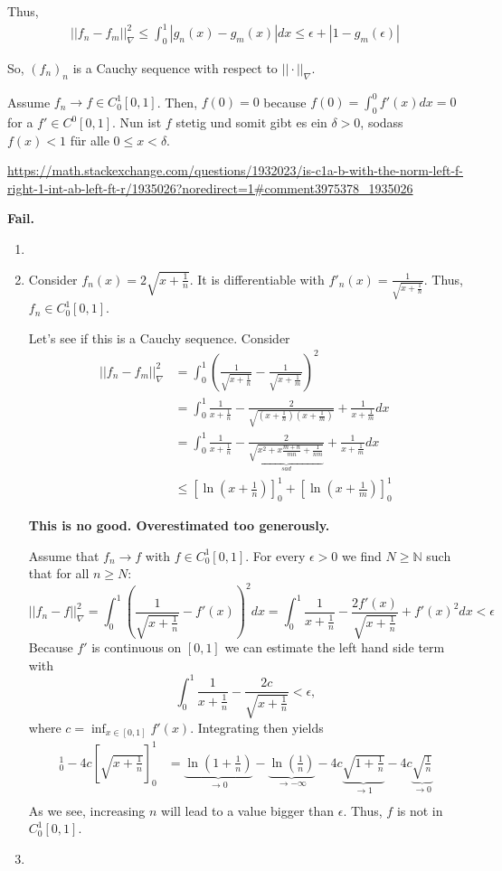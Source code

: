 \documentclass[a4paper]{article}
\renewcommand{\hline}{\noindent\makebox[\linewidth]{\rule{12cm}{1pt}}}
\begin{document}
Thus,
\begin{align*}
||f_n - f_m||^2_\nabla \leq \int^1_0 |g_n(x) - g_m(x)|dx \leq \epsilon + |1 - g_m(\epsilon)|
\end{align*}

So, $(f_n)_n$ is a Cauchy sequence with respect to $||\cdot||_\nabla$.

Assume $f_n \to f \in C^1_0[0,1]$. Then, $f(0) = 0$ because $f(0) = \int^0_0 f'(x) dx = 0$ for a $f' \in C^0[0,1]$. Nun ist $f$ stetig und somit gibt es ein $\delta > 0$, sodass $f(x) < 1$ für alle $0\leq x < \delta$.

\url{https://math.stackexchange.com/questions/1932023/is-c1a-b-with-the-norm-left-f-right-1-int-ab-left-ft-r/1935026?noredirect=1#comment3975378_1935026}

\hline

\textbf{Fail.}

\begin{enumerate}
\item 

\item Consider $f_n(x) = 2\sqrt{x+\frac{1}{n}}$. It is differentiable with $f'_n(x) = \frac{1}{\sqrt{x+\frac{1}{n}}}$. Thus, $f_n \in C^1_0[0,1]$. 

Let's see if this is a Cauchy sequence. Consider
\begin{align*}
	||f_n - f_m||^2_{\nabla} &= \int^1_0 ( \frac{1}{\sqrt{x+\frac{1}{n}}} -  \frac{1}{\sqrt{x+\frac{1}{m}}})^2 \\
	&= \int^1_0 \frac{1}{x+\frac{1}{n}} - \frac{2}{\sqrt{(x + \frac{1}{n})(x + \frac{1}{m})}} + \frac{1}{x+\frac{1}{m}} dx \\
	&= \int^1_0 \frac{1}{x+\frac{1}{n}} - 
	\frac{2}{\underbrace{\sqrt{x^2 +x\frac{m+n}{mn} + \frac{1}{nm}}}_{sad}}
	+ \frac{1}{x+\frac{1}{m}} dx \\
	&\leq [\ln(x+\frac{1}{n})]^1_0 + [\ln(x+\frac{1}{m})]^1_0
\end{align*}

\textbf{This is no good. Overestimated too generously.}

Assume that $f_n \to f$ with $f \in C^1_0[0,1]$. For every $\epsilon > 0$ we find $N \geq \mathbb N$ such that for all $n \geq N$:
\[
	|| f_n - f||^2_{\nabla} = \int_0^1 \left(\frac{1}{\sqrt{x+\frac{1}{n}}} - f'(x)\right )^2 dx = \int^1_0 \frac{1}{x+\frac{1}{n}} - \frac{2f'(x)}{\sqrt{x + \frac{1}{n}}} + f'(x)^2 dx < \epsilon
\]
Because $f'$ is continuous on $[0,1]$ we can estimate the left hand side term with
\[
	\int^1_0 \frac{1}{x + \frac{1}{n}} - \frac{2c}{\sqrt{x+ \frac{1}{n}}} < \epsilon,
\]
where $c = \inf_{x \in [0,1]} f'(x)$. Integrating then yields
\begin{align*}
	[\ln(x + \frac{1}{n})]^1_0 - 4c[\sqrt{x + \frac{1}{n}}]^1_0 &=\underbrace{ \ln(1 + \frac{1}{n})}_{\to 0} - \underbrace{\ln(\frac{1}{n})}_{\to - \infty} - 4c\underbrace{\sqrt{1 + \frac{1}{n}}}_{\to 1} - 4c\underbrace{\sqrt{\frac{1}{n}}}_{\to 0} \\
\end{align*}
As we see, increasing $n$ will lead to a value bigger than $\epsilon$. Thus, $f$ is not in $C^1_0[0,1]$.
\item
\end{enumerate}
\end{document}
